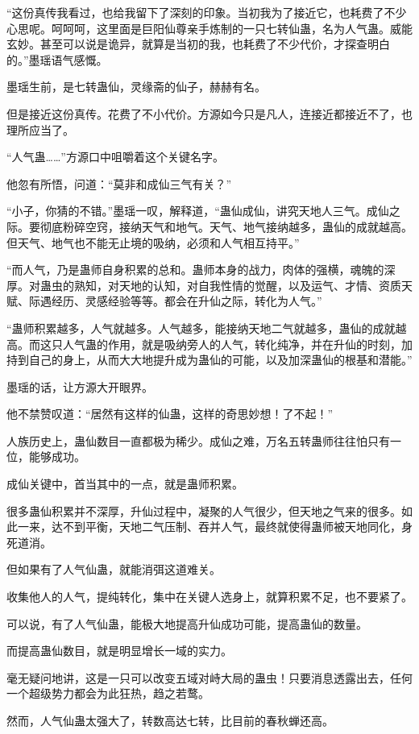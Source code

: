 \begin{this_body}
“这份真传我看过，也给我留下了深刻的印象。当初我为了接近它，也耗费了不少心思呢。呵呵呵，这里面是巨阳仙尊亲手炼制的一只七转仙蛊，名为人气蛊。威能玄妙。甚至可以说是诡异，就算是当初的我，也耗费了不少代价，才探查明白的。”墨瑶语气感慨。

墨瑶生前，是七转蛊仙，灵缘斋的仙子，赫赫有名。

但是接近这份真传。花费了不小代价。方源如今只是凡人，连接近都接近不了，也理所应当了。

“人气蛊……”方源口中咀嚼着这个关键名字。

他忽有所悟，问道：“莫非和成仙三气有关？”

“小子，你猜的不错。”墨瑶一叹，解释道，“蛊仙成仙，讲究天地人三气。成仙之际。要彻底粉碎空窍，接纳天气和地气。天气、地气接纳越多，蛊仙的成就越高。但天气、地气也不能无止境的吸纳，必须和人气相互持平。”

“而人气，乃是蛊师自身积累的总和。蛊师本身的战力，肉体的强横，魂魄的深厚。对蛊虫的熟知，对天地的认知，对自我性情的觉醒，以及运气、才情、资质天赋、际遇经历、灵感经验等等。都会在升仙之际，转化为人气。”

“蛊师积累越多，人气就越多。人气越多，能接纳天地二气就越多，蛊仙的成就越高。而这只人气蛊的作用，就是吸纳旁人的人气，转化纯净，并在升仙的时刻，加持到自己的身上，从而大大地提升成为蛊仙的可能，以及加深蛊仙的根基和潜能。”

墨瑶的话，让方源大开眼界。

他不禁赞叹道：“居然有这样的仙蛊，这样的奇思妙想！了不起！”

人族历史上，蛊仙数目一直都极为稀少。成仙之难，万名五转蛊师往往怕只有一位，能够成功。

成仙关键中，首当其中的一点，就是蛊师积累。

很多蛊仙积累并不深厚，升仙过程中，凝聚的人气很少，但天地之气来的很多。如此一来，达不到平衡，天地二气压制、吞并人气，最终就使得蛊师被天地同化，身死道消。

但如果有了人气仙蛊，就能消弭这道难关。

收集他人的人气，提纯转化，集中在关键人选身上，就算积累不足，也不要紧了。

可以说，有了人气仙蛊，能极大地提高升仙成功可能，提高蛊仙的数量。

而提高蛊仙数目，就是明显增长一域的实力。

毫无疑问地讲，这是一只可以改变五域对峙大局的蛊虫！只要消息透露出去，任何一个超级势力都会为此狂热，趋之若鹜。

然而，人气仙蛊太强大了，转数高达七转，比目前的春秋蝉还高。


\end{this_body}
